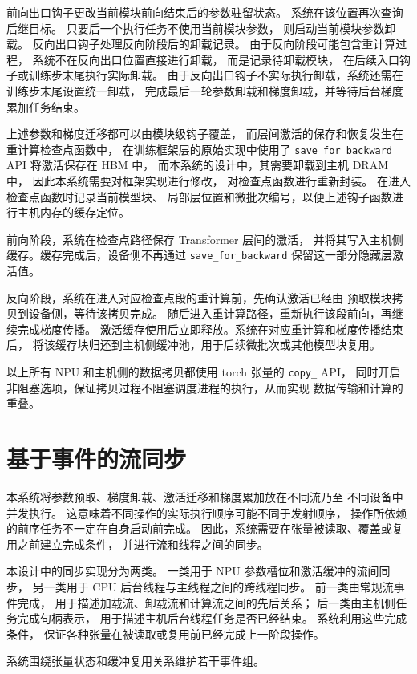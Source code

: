 \documentclass[bachelor,openany,oneside,color,AutoFakeBold=true]{buaathesis}
\begin{document}
前向出口钩子更改当前模块前向结束后的参数驻留状态。
系统在该位置再次查询后继目标。
只要后一个执行任务不使用当前模块参数，
则启动当前模块参数卸载。
反向出口钩子处理反向阶段后的卸载记录。
由于反向阶段可能包含重计算过程，
系统不在反向出口位置直接进行卸载，
而是记录待卸载模块，
在后续入口钩子或训练步末尾执行实际卸载。
由于反向出口钩子不实际执行卸载，系统还需在训练步末尾设置统一卸载，
完成最后一轮参数卸载和梯度卸载，并等待后台梯度累加任务结束。

上述参数和梯度迁移都可以由模块级钩子覆盖，
而层间激活的保存和恢复发生在重计算检查点函数中，
在训练框架层的原始实现中使用了 \texttt{save\_for\_backward} API 将激活保存在 HBM 中，
而本系统的设计中，其需要卸载到主机 DRAM 中，
因此本系统需要对框架实现进行修改，
对检查点函数进行重新封装。
在进入检查点函数时记录当前模型块、
局部层位置和微批次编号，以便上述钩子函数进行主机内存的缓存定位。

前向阶段，系统在检查点路径保存 Transformer 层间的激活，
并将其写入主机侧缓存。缓存完成后，设备侧不再通过
\texttt{save\_for\_backward} 保留这一部分隐藏层激活值。

反向阶段，系统在进入对应检查点段的重计算前，先确认激活已经由
预取模块拷贝到设备侧，等待该拷贝完成。
随后进入重计算路径，重新执行该段前向，再继续完成梯度传播。
激活缓存使用后立即释放。系统在对应重计算和梯度传播结束后，
将该缓存块归还到主机侧缓冲池，用于后续微批次或其他模型块复用。

以上所有 NPU 和主机侧的数据拷贝都使用 torch 张量的 \texttt{copy\_} API，
同时开启非阻塞选项，保证拷贝过程不阻塞调度进程的执行，从而实现
数据传输和计算的重叠。


\section{基于事件的流同步}

本系统将参数预取、梯度卸载、激活迁移和梯度累加放在不同流乃至
不同设备中并发执行。
这意味着不同操作的实际执行顺序可能不同于发射顺序，
操作所依赖的前序任务不一定在自身启动前完成。
因此，系统需要在张量被读取、覆盖或复用之前建立完成条件，
并进行流和线程之间的同步。

本设计中的同步实现分为两类。
一类用于 NPU 参数槽位和激活缓冲的流间同步，
另一类用于 CPU 后台线程与主线程之间的跨线程同步。
前一类由常规流事件完成，
用于描述加载流、卸载流和计算流之间的先后关系；
后一类由主机侧任务完成句柄表示，
用于描述主机后台线程任务是否已经结束。
系统利用这些完成条件，
保证各种张量在被读取或复用前已经完成上一阶段操作。

系统围绕张量状态和缓冲复用关系维护若干事件组。
\end{document}
